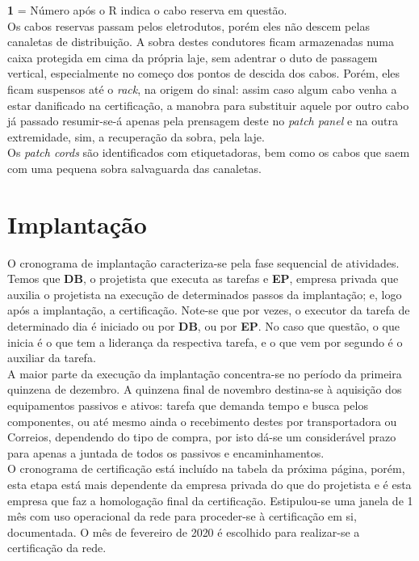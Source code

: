 \documentclass[	DIV=calc,%
							paper=a4,%
							fontsize=12pt,%
							onecolumn]{scrartcl}	 					%
\begin{document}
\textbf{1} = Número após o R indica o cabo reserva em questão.
\\

Os cabos reservas passam pelos eletrodutos, porém eles não descem pelas canaletas de distribuição. A sobra destes condutores ficam armazenadas numa caixa protegida em cima da própria laje, sem adentrar o duto de passagem vertical, especialmente no começo dos pontos de descida dos cabos. Porém, eles ficam suspensos até o \textit{rack}, na origem do sinal: assim caso algum cabo venha a estar danificado na certificação, a manobra para substituir aquele por outro cabo já passado resumir-se-á apenas pela prensagem deste no \textit{patch panel} e na outra extremidade, sim, a recuperação da sobra, pela laje.
\\

Os \textit{patch cords} são identificados com etiquetadoras, bem como os cabos que saem com uma pequena sobra salvaguarda das canaletas.

\section{Implantação}

O cronograma de implantação caracteriza-se pela fase sequencial de atividades. Temos que \textbf{DB}, o projetista que executa as tarefas e \textbf{EP}, empresa privada que auxilia o projetista na execução de determinados passos da implantação; e, logo após a implantação, a certificação. Note-se que por vezes, o executor da tarefa de determinado dia é iniciado ou por \textbf{DB}, ou por \textbf{EP}. No caso que questão, o que inicia é o que tem a liderança da respectiva tarefa, e o que vem por segundo é o auxiliar da tarefa.
\\

A maior parte da execução da implantação concentra-se no período da primeira quinzena de dezembro. A quinzena final de novembro destina-se à aquisição dos equipamentos passivos e ativos: tarefa que demanda tempo e busca pelos componentes, ou até mesmo ainda o recebimento destes por transportadora ou Correios, dependendo do tipo de compra, por isto dá-se um considerável prazo para apenas a juntada de todos os passivos e encaminhamentos.
\\

O cronograma de certificação está incluído na tabela da próxima página, porém, esta etapa está mais dependente da empresa privada do que do projetista e é esta empresa que faz a homologação final da certificação. Estipulou-se uma janela de 1 mês com uso operacional da rede para proceder-se à certificação em si, documentada. O mês de fevereiro de 2020 é escolhido para realizar-se a certificação da rede.
\\
\end{document}
